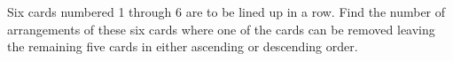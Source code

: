 Six cards numbered 1 through 6 are to be lined up in a row. Find the number of arrangements of these six cards where one of the cards can be removed leaving the remaining five cards in either ascending or descending order.